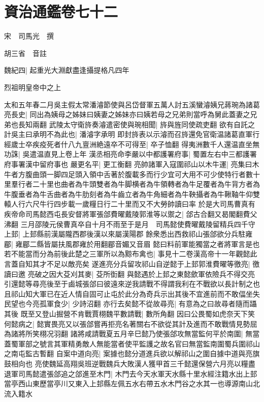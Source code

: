 \section{資治通鑑卷七十二}
宋　司馬光　撰

胡三省　音註

魏紀四|{
	起重光大淵獻盡逢攝提格凡四年}


烈祖明皇帝中之上

太和五年春二月吳主假太常潘濬節使與呂岱督軍五萬人討五溪蠻濬姨兄蔣琬為諸葛亮長史|{
	同出為姨母之姊妹曰姨妻之姊妹亦曰姨若母之兄弟則當呼為舅此蓋妻之兄弟也長知兩翻}
武陵太守衛旍奏濬遣密使與琬相聞|{
	旍與旌同使疏吏翻}
欲有自託之計吳主曰承明不為此也|{
	潘濬字承明}
即封旍表以示濬而召旍還免官衛温諸葛直軍行經歲士卒疾疫死者什八九亶洲絶遠卒不可得至|{
	卒子恤翻}
得夷洲數千人還温直坐無功誅|{
	吳遣温直見上卷上年}
漢丞相亮命李嚴以中都護署府事|{
	蜀置左右中三都護署府事署漢中留府事也}
嚴更名平|{
	更工衡翻}
亮帥諸軍入寇圍祁山以木牛運|{
	亮集曰木牛者方腹曲頭一脚四足頭入領中舌著於腹載多而行少宜可大用不可少使特行者數十里羣行者二十里也曲者為牛頭雙者為牛脚横者為牛領轉者為牛足覆者為牛背方者為牛腹垂者為牛舌曲者為牛肋刻者為牛齒立者為牛角細者為牛鞅攝者為牛鞦䩜牛仰雙轅人行六尺牛行四步載一歲糧日行二十里而又不大勞帥讀曰率}
於是大司馬曹真有疾帝命司馬懿西屯長安督將軍張郃費曜戴陵郭淮等以禦之|{
	郃古合翻又曷閣翻費父沸翻}
三月邵陵元侯曹真卒自十月不雨至于是月　司馬懿使費曜戴陵留精兵四千守上邽|{
	上邽縣前漢屬隴西郡後漢以來屬漢陽郡}
餘衆悉出西救祁山張郃欲分兵駐雍郿|{
	雍郿二縣皆屬扶風郡雍於用翻郿音媚又音眉}
懿曰料前軍能獨當之者將軍言是也若不能當而分為前後此楚之三軍所以為黥布禽也|{
	事見十二卷漢高帝十一年觀懿此言蓋自知其才不足以敵亮矣}
遂進亮分兵留攻祁山自逆懿于上邽郭淮費曜等徼亮|{
	徼讀曰邀}
亮破之因大芟刈其麥|{
	芟所衘翻}
與懿遇於上邽之東懿歛軍依險兵不得交亮引還懿等尋亮後至于鹵城張郃曰彼遠來逆我請戰不得謂我利在不戰欲以長計制之也且祁山知大軍已在近人情自固可止屯於此分為奇兵示出其後不宜進前而不敢偪坐失民望也今亮孤軍食少|{
	少詩沼翻}
亦行去矣懿不從故尋亮|{
	有意為之曰故尋者隨而躡其後}
既至又登山掘營不肯戰賈栩魏平數請戰|{
	數所角翻}
因曰公畏蜀如虎奈天下笑何懿病之|{
	懿實畏亮又以張郃嘗再拒亮名著關右不欲從其計及進而不敢戰情見勢屈為諸將所笑栩况羽翻}
諸將咸請戰夏五月辛巳懿乃使張郃攻無當監何平於南圍|{
	無當蓋蜀軍部之號言其軍精勇敵人無能當者使平監護之故名官曰無當監南圍蜀兵圍祁山之南屯監古暫翻}
自案中道向亮|{
	案據也懿分道進兵欲以解祁山之圍自據中道與亮旗鼓相向也}
亮使魏延高翔吳班逆戰魏兵大敗漢人獲甲首三千懿還保營六月亮以糧盡退軍司馬懿遣張郃追之郃進至木門|{
	木門去今天水軍天水縣十里水經注籍水出上邽當亭西山東歷當亭川又東入上邽縣左佩五水右帶五水木門谷之水其一也導源南山北流入籍水}
